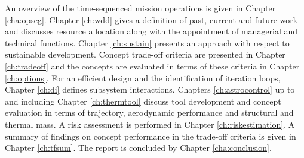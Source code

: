 An overview of the time-sequenced mission operations is given in Chapter \ref{cha:opseg}. Chapter \ref{ch:wdd} gives a definition of past, current and future work and discusses resource allocation along with the appointment of managerial and technical functions. Chapter \ref{ch:sustain} presents an approach with respect to sustainable development.  Concept trade-off criteria are presented in Chapter \ref{ch:tradeoff} and the concepts are evaluated in terms of these criteria in Chapter \ref{ch:options}. For an efficient design and the identification of iteration loops, Chapter \ref{ch:di} defines subsystem interactions. Chapters \ref{ch:astrocontrol} up to and including Chapter \ref{ch:thermtool} discuss tool development and concept evaluation in terms of trajectory, aerodynamic performance and structural and thermal mass. A risk assessment is performed in Chapter \ref{ch:riskestimation}. A summary of findings on concept performance in the trade-off criteria is given in Chapter \ref{ch:tfsum}. The report is concluded by Chapter \ref{cha:conclusion}.






